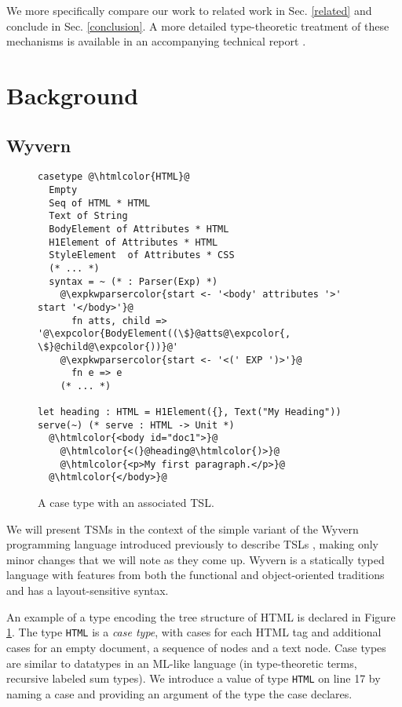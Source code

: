 \documentclass{sig-alternate}[10pt]
\newcommand{\htmlcolor}[1]{\textcolor[HTML]{339933}{#1}}
\newcommand{\expkwparsercolor}[1]{\textcolor[HTML]{336699}{#1}}
\newcommand{\expcolor}[1]{\textcolor[HTML]{FF0033}{#1}}
\newcommand{\mycaption}[1]{\vspace{-10px}\caption{#1}\vspace{-8px}}
\newcommand{\lstinlinew}[1]{\lstinline[style=wyvern]{#1}}
\begin{document}
We more specifically compare our work to related work in Sec. \ref{related} and conclude in Sec. \ref{conclusion}. A more detailed type-theoretic treatment of these mechanisms is available in an accompanying technical report \cite{sac15tr}.

\section{Background}\label{background}
\subsection{Wyvern}

\begin{figure}[t!]
\begin{lstlisting}[style=wyvern]
casetype @\htmlcolor{HTML}@
  Empty
  Seq of HTML * HTML 
  Text of String
  BodyElement of Attributes * HTML
  H1Element of Attributes * HTML
  StyleElement  of Attributes * CSS
  (* ... *)
  syntax = ~ (* : Parser(Exp) *)
    @\expkwparsercolor{start <- '<body' attributes '>' start '</body>'}@
      fn atts, child => '@\expcolor{BodyElement((\$}@atts@\expcolor{, \$}@child@\expcolor{))}@'
    @\expkwparsercolor{start <- '<(' EXP ')>'}@
      fn e => e
    (* ... *)

let heading : HTML = H1Element({}, Text("My Heading"))
serve(~) (* serve : HTML -> Unit *)
  @\htmlcolor{<body id="doc1">}@
    @\htmlcolor{<(}@heading@\htmlcolor{)>}@
    @\htmlcolor{<p>My first paragraph.</p>}@
  @\htmlcolor{</body>}@
\end{lstlisting}
\mycaption{A case type with an associated TSL.}
\label{f-htmltype}
\end{figure}
We will present TSMs in the context of the simple variant of the Wyvern programming language introduced previously to describe TSLs  \cite{TSLs}, making only minor changes that we will note as they come up. Wyvern is a statically typed  language with features from both the functional and object-oriented traditions and has a layout-sensitive syntax. 

An example of a type encoding the tree structure of HTML is declared in Figure \ref{f-htmltype}. The type \lstinlinew{HTML} is a \emph{case type}, with cases for each HTML tag and additional cases for an empty document, a sequence of nodes and a text node. Case types are similar to datatypes in an ML-like language (in type-theoretic terms, recursive labeled sum types). 
We introduce a value of type \lstinlinew{HTML} on line 17 by naming a case and providing an argument of the type the case declares.
\end{document}
